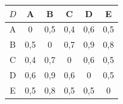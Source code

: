 \begin{tabular}{@{}c|ccccc@{}}
$D$ & A & B & C & D & E\\\midrule
A & 0 & 0{,}5 & 0{,}4 & 0{,}6 & 0{,}5\\
B & 0{,}5 & 0 & 0{,}7 & 0{,}9 & 0{,}8\\
C & 0{,}4 & 0{,}7 & 0 & 0{,}6 & 0{,}5\\
D & 0{,}6 & 0{,}9 & 0{,}6 & 0 & 0{,}5\\
E & 0{,}5 & 0{,}8 & 0{,}5 & 0{,}5 & 0\\
\end{tabular}
